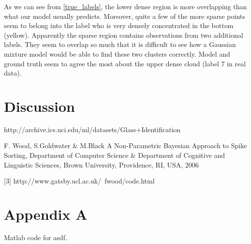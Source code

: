 \documentclass[a4paper]{article}
\begin{document}
As we can see from \ref{true_labels}, the lower dense region is more overlapping than what our model usually predicts. Moreover,  quite a few of the more sparse points seem to belong into the label who is very densely concentrated in the bottom (yellow). Apparently the sparse region contains observations from two additional labels. They seem to overlap so much that it is difficult to see how a Gaussian mixture model would be able to find these two clusters correctly. Model and ground truth seem to agree the most about the upper dense cloud (label 7 in real data). 

\section{Discussion}

\par
[1] http://archive.ics.uci.edu/ml/datasets/Glass+Identification
\par
[2] F. Wood, S.Goldwater \& M.Black A Non-Parametric Bayesian Approach to Spike Sorting, Department of Computer Science \& Department of Cognitive and Linguistic Sciences, Brown University, Providence, RI, USA, 2006

[3] http://www.gatsby.ucl.ac.uk/~fwood/code.html




\clearpage
\appendix

\clearpage
\section*{Appendix A}\label{code:asdf}

Matlab code for asdf.

%
\end{document}
